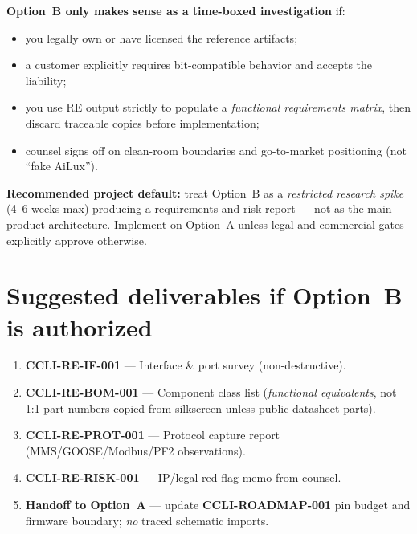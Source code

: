 \documentclass[11pt,a4paper]{article}
\newcommand{\docref}[1]{\textbf{#1}}
\begin{document}
\textbf{Option~B only makes sense as a time-boxed investigation} if:
\begin{itemize}[noitemsep]
  \item you legally own or have licensed the reference artifacts;
  \item a customer explicitly requires bit-compatible behavior and accepts the liability;
  \item you use RE output strictly to populate a \emph{functional requirements matrix}, then discard traceable copies before implementation;
  \item counsel signs off on clean-room boundaries and go-to-market positioning (not ``fake AiLux'').
\end{itemize}

\begin{center}
\begin{minipage}{0.95\linewidth}
\colorbox{warnbg}{%
  \parbox{\dimexpr\linewidth-2\fboxsep\relax}{%
    \small
    \textbf{\textcolor{warnamber}{Recommended project default:}}
    treat Option~B as a \emph{restricted research spike} (4--6 weeks max) producing a requirements and risk report ---
    not as the main product architecture. Implement on Option~A unless legal and commercial gates explicitly approve otherwise.
  }%
}
\end{minipage}
\end{center}

\section{Suggested deliverables if Option~B is authorized}

\begin{enumerate}[leftmargin=*]
  \item \textbf{CCLI-RE-IF-001} --- Interface \& port survey (non-destructive).
  \item \textbf{CCLI-RE-BOM-001} --- Component class list (\emph{functional equivalents}, not 1:1 part numbers copied from silkscreen unless public datasheet parts).
  \item \textbf{CCLI-RE-PROT-001} --- Protocol capture report (MMS/GOOSE/Modbus/PF2 observations).
  \item \textbf{CCLI-RE-RISK-001} --- IP/legal red-flag memo from counsel.
  \item \textbf{Handoff to Option~A} --- update \docref{CCLI-ROADMAP-001} pin budget and firmware boundary; \emph{no} traced schematic imports.
\end{enumerate}
\end{document}
